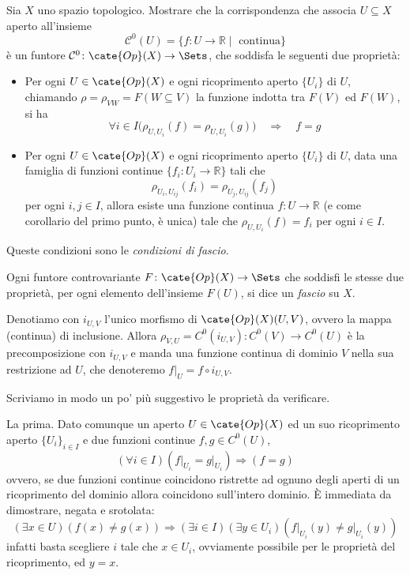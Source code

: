 \begin{MyExercise}
Sia $X$ uno spazio topologico. Mostrare che la corrispondenza che associa $U\subseteq X$ aperto all'insieme
\[
\mathcal C^0(U) = \{f\colon U\to \mathbb{R}\mid \text{ continua}\}
\]
\`e un funtore $\mathcal C^0\colon \cate{Op}(X)\to \Sets$, che soddisfa le seguenti due propriet\`a:
\begin{itemize}
\item Per ogni $U\in\cate{Op}(X)$ e ogni ricoprimento aperto $\{U_i\}$ di $U$, chiamando $\rho=\rho_{VW}=F(W\subseteq V)$ la funzione indotta tra $F(V)$ ed $F(W)$, si ha
\[
\forall i\in I\big(\rho_{U, U_i}(f) = \rho_{U, U_i}(g)\big)\quad \Rightarrow \quad f=g
\]
\item Per ogni $U\in\cate{Op}(X)$ e ogni ricoprimento aperto $\{U_i\}$ di $U$, data una famiglia di funzioni continue $\{f_i\colon U_i\to \mathbb R\}$ tali che
\[
\rho_{U_i, U_{ij}}(f_i) = \rho_{U_j, U_{ij}}(f_j)
\]
per ogni $i,j\in I$, allora esiste una funzione continua $f\colon U\to \mathbb R$ (e come corollario del primo punto, \`e unica) tale che $\rho_{U, U_i}(f)= f_i$ per ogni $i\in I$.
\end{itemize}\end{MyExercise}
Queste condizioni sono le \emph{condizioni di fascio}.
\begin{df}
Ogni funtore controvariante $F\colon \cate{Op}(X)\to \Sets$ che soddisfi le stesse due propriet\`a, per ogni elemento dell'insieme $F(U)$, si dice un \emph{fascio} su $X$.
\end{df}

Denotiamo con $i_{U,V}$ l'unico morfismo di $\cate{Op}(X)(U,V)$, ovvero la mappa (continua) di inclusione. Allora $\rho_{V,U}=C^0(i_{U,V})\colon C^0(V)\to C^0(U)$ è la precomposizione con $i_{U,V}$ e manda una funzione continua di dominio $V$ nella sua restrizione ad $U$, che denoteremo $f\vert_U=f\circ i_{U,V}$.

Scriviamo in modo un po' più suggestivo le proprietà da verificare.

La prima. Dato comunque un aperto $U\in\cate{Op}(X)$ ed un suo ricoprimento aperto $\{U_i\}_{i\in I}$ e due funzioni continue $f,g\in C^0(U)$,
\[
(\forall i\in I) \left(f\vert_{U_i}=g\vert_{U_i}\right) \Rightarrow (f=g)
\]
ovvero, se due funzioni continue coincidono ristrette ad ognuno degli aperti di un ricoprimento del dominio allora coincidono sull'intero dominio.
È immediata da dimostrare, negata e srotolata:
\[
(\exists x\in U)(f(x)\neq g(x)) \Rightarrow (\exists i\in I)(\exists y\in U_i)(f\vert_{U_i}(y)\neq g\vert_{U_i}(y))
\]
infatti basta scegliere $i$ tale che $x\in U_i$, ovviamente possibile per le proprietà del ricoprimento, ed $y=x$.

